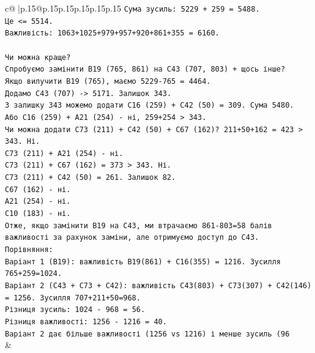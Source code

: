 \documentclass{article}
\begin{document}
{\begin{supertabular}{c@{$\;$}|p{.15\linewidth}@{}p{.15\linewidth}p{.15\linewidth}p{.15\linewidth}p{.15\linewidth}p{.15\linewidth}}
{{{\texttt{Сума зусиль: 5229 + 259 = 5488.} \\
\texttt{Це <= 5514.} \\
\texttt{Важливість: 1063+1025+979+957+920+861+355 = 6160.} \\
\\ 
\texttt{Чи можна краще?} \\
\texttt{Спробуємо замінити B19 (765, 861) на C43 (707, 803) + щось інше?} \\
\texttt{Якщо вилучити B19 (765), маємо 5229{-}765 = 4464.} \\
\texttt{Додамо C43 (707) {-}> 5171. Залишок 343.} \\
\texttt{З залишку 343 можемо додати C16 (259) + C42 (50) = 309. Сума 5480.} \\
\texttt{Або C16 (259) + A21 (254) {-} ні, 259+254 > 343.} \\
\texttt{Чи можна додати C73 (211) + C42 (50) + C67 (162)? 211+50+162 = 423 > 343. Ні.} \\
\texttt{C73 (211) + A21 (254) {-} ні.} \\
\texttt{C73 (211) + C67 (162) = 373 > 343. Ні.} \\
\texttt{C73 (211) + C42 (50) = 261. Залишок 82.} \\
\texttt{C67 (162) {-} ні.} \\
\texttt{A21 (254) {-} ні.} \\
\texttt{C10 (183) {-} ні.} \\
\texttt{Отже, якщо замінити B19 на C43, ми втрачаємо 861{-}803=58 балів важливості за рахунок заміни, але отримуємо доступ до C43.} \\
\texttt{Порівняння:} \\
\texttt{Варіант 1 (B19): важливість B19(861) + C16(355) = 1216. Зусилля 765+259=1024.} \\
\texttt{Варіант 2 (C43 + C73 + C42): важливість C43(803) + C73(307) + C42(146) = 1256. Зусилля 707+211+50=968.} \\
\texttt{Різниця зусиль: 1024 {-} 968 = 56.} \\
\texttt{Різниця важливості: 1256 {-} 1216 = 40.} \\
\texttt{Варіант 2 дає більше важливості (1256 vs 1216) і менше зусиль (96} \\
            }
        }
    }
    & \\ \\


\end{supertabular}}
\end{document}
